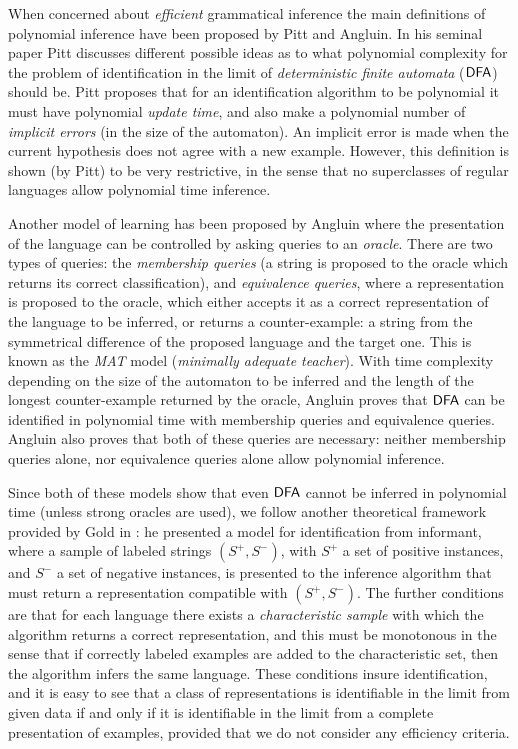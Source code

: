 When concerned about \emph{efficient} grammatical inference \citep{delaHiguera1997} the main definitions of polynomial inference have been proposed by Pitt and Angluin. In his seminal paper \citep{Pitt89} Pitt discusses different possible ideas as to what polynomial complexity for the problem of identification in the limit of \emph{deterministic finite automata} ($\textup{\sf DFA}$) should be. Pitt proposes that for an identification algorithm to be polynomial it must have polynomial \emph{update time}, and also make a polynomial number of \emph{implicit errors} (in the size of the automaton). An implicit error is made when the current hypothesis does not agree with a new example. However, this definition is shown (by Pitt) to be very restrictive, in the sense that no superclasses of regular languages allow polynomial time inference.

Another model of learning has been proposed by Angluin \citep{Angluin1988} where the presentation of the language can be controlled by asking queries to an \emph{oracle}. There are two types of queries: the \emph{membership queries} (a string is proposed to the oracle which returns its correct classification), and \emph{equivalence queries}, where a representation is proposed to the oracle, which either accepts it as a correct representation of the language to be inferred, or returns a counter-example: a string from the symmetrical difference of the proposed language and the target one. This is known as the \emph{MAT} model (\emph{minimally adequate teacher}). With time complexity depending on the size of the automaton to be inferred and the length of the longest counter-example returned by the oracle, Angluin proves that $\textup{\sf DFA}$ can be identified in polynomial time with membership queries and equivalence queries. Angluin also proves that both of these queries are necessary: neither membership queries alone, nor equivalence queries alone allow polynomial inference.

Since both of these models show that even $\textup{\sf DFA}$ cannot be inferred in polynomial time (unless strong oracles are used), we follow another theoretical framework provided by Gold in \citep{Gold78}: he presented a model for identification from informant, where a sample of labeled strings $(S^+, S^-)$, with $S^+$ a set of positive instances, and $S^-$ a set of negative instances, is presented to the inference algorithm that must return a representation compatible with $(S^+, S^-)$. The further conditions are that for each language there exists a \emph{characteristic sample} with which the algorithm returns a correct representation, and this must be monotonous in the sense that if correctly labeled examples are added to the characteristic set, then the algorithm infers the same language. These conditions insure identification, and it is easy to see that a class of representations is identifiable in the limit from given data if and only if it is identifiable in the limit from a complete presentation of examples, provided that we do not consider any efficiency criteria.

